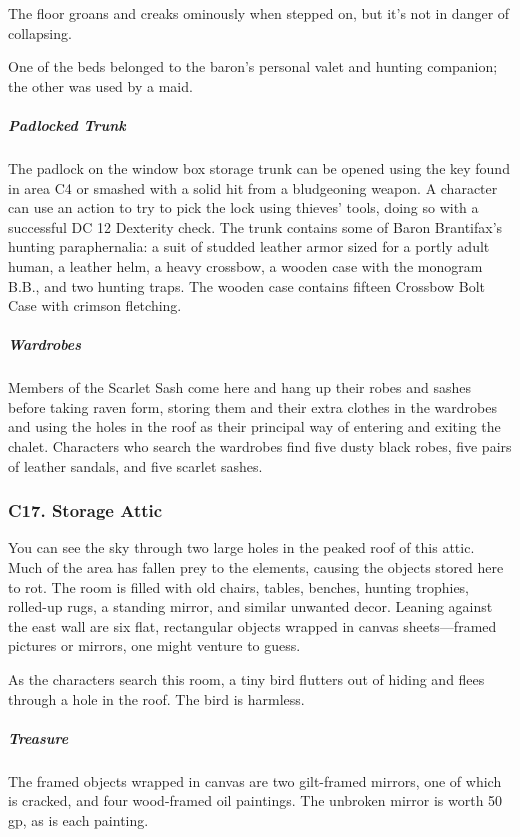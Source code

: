 \documentclass[10pt,a4paper,twoside,bg=print,twocolumn,openany,nodeprecatedcode]{dndbook}
\begin{document}
The floor groans and creaks ominously when stepped on, but it's not in danger of collapsing.

One of the beds belonged to the baron's personal valet and hunting companion; the other was used by a maid.

\subparagraph{Padlocked Trunk}
The padlock on the window box storage trunk can be opened using the key found in area C4 or smashed with a solid hit from a bludgeoning weapon. A character can use an action to try to pick the lock using thieves' tools, doing so with a successful DC 12 Dexterity check. The trunk contains some of Baron Brantifax's hunting paraphernalia: a suit of studded leather armor sized for a portly adult human, a leather helm, a heavy crossbow, a wooden case with the monogram B.B., and two hunting traps. The wooden case contains fifteen Crossbow Bolt Case with crimson fletching.

\subparagraph{Wardrobes}
Members of the Scarlet Sash come here and hang up their robes and sashes before taking raven form, storing them and their extra clothes in the wardrobes and using the holes in the roof as their principal way of entering and exiting the chalet. Characters who search the wardrobes find five dusty black robes, five pairs of leather sandals, and five scarlet sashes.

\subsubsection{C17. Storage Attic}
\begin{DndReadAloud}{}
You can see the sky through two large holes in the peaked roof of this attic. Much of the area has fallen prey to the elements, causing the objects stored here to rot. The room is filled with old chairs, tables, benches, hunting trophies, rolled-up rugs, a standing mirror, and similar unwanted decor. Leaning against the east wall are six flat, rectangular objects wrapped in canvas sheets—framed pictures or mirrors, one might venture to guess. 

\end{DndReadAloud}

As the characters search this room, a tiny bird flutters out of hiding and flees through a hole in the roof. The bird is harmless.

\subparagraph{Treasure}
The framed objects wrapped in canvas are two gilt-framed mirrors, one of which is cracked, and four wood-framed oil paintings. The unbroken mirror is worth 50 gp, as is each painting.
\end{document}
